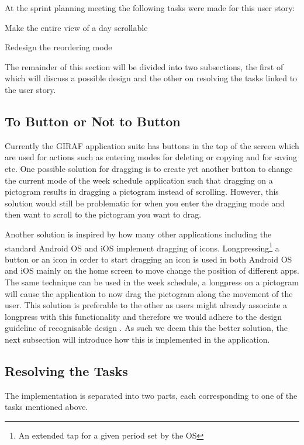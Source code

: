 \bigskip \noindent
At the sprint planning meeting the following tasks were made for this user story:
\begin{eletterate}
    \item Make the entire view of a day scrollable
    \item Redesign the reordering mode
\end{eletterate}
The remainder of this section will be divided into two subsections, the first of which will discuss a possible design and the other on resolving the tasks linked to the user story.

\subsection{To Button or Not to Button} %
Currently the GIRAF application suite has buttons in the top of the screen which are used for actions such as entering modes for deleting or copying and for saving etc.
One possible solution for dragging is to create yet another button to change the current mode of the week schedule application such that dragging on a pictogram results in dragging a pictogram instead of scrolling.
However, this solution would still be problematic for when you enter the dragging mode and then want to scroll to the pictogram you want to drag.

Another solution is inspired by how many other applications including the standard Android OS and iOS implement dragging of icons.
Longpressing\footnote{An extended tap for a given period set by the OS} a button or an icon in order to start dragging an icon is used in both Android OS and iOS mainly on the home screen to move change the position of different apps.
The same technique can be used in the week schedule, a longpress on a pictogram will cause the application to now drag the pictogram along the movement of the user.
This solution is preferable to the other as users might already associate a longpress with this functionality and therefore we would adhere to the design guideline of recognisable design \cite[p.~51]{DESIGNBOOK}.
As such we deem this the better solution, the next subsection will introduce how this is implemented in the application.

\subsection{Resolving the Tasks}
The implementation is separated into two parts, each corresponding to one of the tasks mentioned above.
